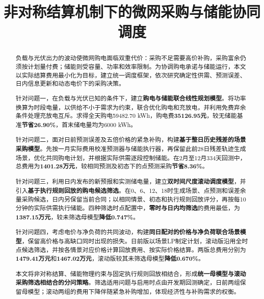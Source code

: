 \documentclass[withoutpreface,bwprint]{cumcmthesis}
\title{非对称结算机制下的微网采购与储能协同调度}
\begin{document}
\maketitle
\begin{abstract}
\setlength{\parskip}{0.45em}
负载与光伏出力的波动使微网购电面临双重代价：采购不足需要高价补购，采购富余仍须按计划量付费；储能则受容量、功率和效率限制。为协调购电承诺与储能运行，本文以实际结算费用最小化为目标，建立统一调度框架，依次研究确定性供需、预测误差、日内信息更新和动态电价下的采购决策。

针对问题一，在负载与光伏已知的条件下，建立\textbf{\heiti 购电与储能联合线性规划模型}。将功率换算为时段电量，以供给不小于需求为约束，联合优化购电和充放电，并利用免费弃余条件处理充放电互斥。求得全天购电59482.70 kWh，购电费\textbf{35126.95元}，较无储能基准\textbf{节省26.90\%}，首末储电量均为6000 kWh。

针对问题二，面对日前预测误差及五倍价格的紧急补购，构建\textbf{\heiti 基于整日历史残差的场景采购模型}。先按一月实际费用校准预测器与储能执行器，再保留此前28日残差轨迹生成场景，优化共同购电计划，并根据实际供需逐段控制储能。在2月至12月334天回测中，总费用为\textbf{1401.28万元}，较相同预测及初态下的点预测采购\textbf{节省8.36\%}。

针对问题三，利用日内发布的新预报和实测储电量，建立\textbf{\heiti 双时间尺度滚动调度模型}，并引入\textbf{\heiti 基于执行规则回放的购电候选筛选}。在0、6、12、18时生成场景、点预测和误差余量采购候选，日内另保留当前合同；以相同情景、初态和执行规则回放评分，再按每10分钟的实际供需执行储能。四种筛选时点配置中，\textbf{\heiti 零时与日内均筛选}的费用最低，为\textbf{1387.15万元}，较未筛选母模型\textbf{降低0.747\%}。

针对问题四，考虑电价与净负荷的共同波动，构建\textbf{\heiti 同日配对的价格与净负荷联合场景模型}，保留高价格与高缺口同时出现的损失。日前版以场景LP制定计划，滚动版沿用全时点候选筛选，并按各情景对应价格计算回放费用、按实际价格结算。两版总费用分别为\textbf{1479.41万元}和\textbf{1467.02万元}，滚动版较其未筛选母模型\textbf{降低0.670\%}。

本文将非对称结算、储能物理约束与固定执行规则回放相结合，形成\textbf{\heiti 统一母模型与滚动采购筛选相结合的分问策略}。筛选适用问题与启用时点由开发期回测确定，日前两组保留母模型；滚动两组的费用下降伴随紧急补购增加，体现经济性与补购需求的权衡。

\end{abstract}


\FloatBarrier

\FloatBarrier

\FloatBarrier

\FloatBarrier

\FloatBarrier

\end{document}
